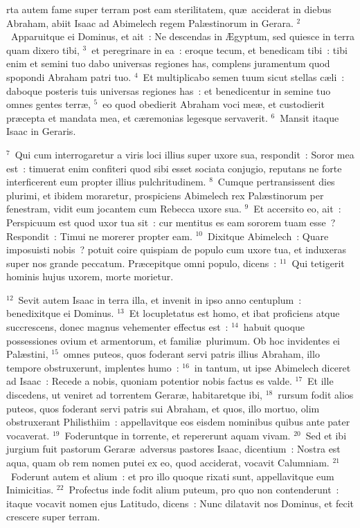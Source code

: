 \bchapter
{}rta autem fame super terram post eam sterilitatem, qu\ae\ acciderat in diebus Abraham, abiit Isaac ad Abimelech regem Pal\ae stinorum in Gerara.
${}^{2}$~Apparuitque ei Dominus, et ait~: Ne descendas in \AE gyptum, sed quiesce in terra quam dixero tibi,
${}^{3}$~et peregrinare in ea~: eroque tecum, et benedicam tibi~: tibi enim et semini tuo dabo universas regiones has, complens juramentum quod spopondi Abraham patri tuo.
${}^{4}$~Et multiplicabo semen tuum sicut stellas c\ae li~: daboque posteris tuis universas regiones has~: et benedicentur in semine tuo omnes gentes terr\ae ,
${}^{5}$~eo quod obedierit Abraham voci me\ae , et custodierit pr\ae cepta et mandata mea, et c\ae remonias legesque servaverit.
${}^{6}$~Mansit itaque Isaac in Geraris.


${}^{7}$~Qui cum interrogaretur a viris loci illius super uxore sua, respondit~: Soror mea est~: timuerat enim confiteri quod sibi esset sociata conjugio, reputans ne forte interficerent eum propter illius pulchritudinem.
${}^{8}$~Cumque pertransissent dies plurimi, et ibidem moraretur, prospiciens Abimelech rex Pal\ae stinorum per fenestram, vidit eum jocantem cum Rebecca uxore sua.
${}^{9}$~Et accersito eo, ait~: Perspicuum est quod uxor tua sit~: cur mentitus es eam sororem tuam esse~? Respondit~: Timui ne morerer propter eam.
${}^{10}$~Dixitque Abimelech~: Quare imposuisti nobis~? potuit coire quispiam de populo cum uxore tua, et induxeras super nos grande peccatum. Pr\ae cepitque omni populo, dicens~:
${}^{11}$~Qui tetigerit hominis hujus uxorem, morte morietur.


${}^{12}$~Sevit autem Isaac in terra illa, et invenit in ipso anno centuplum~: benedixitque ei Dominus.
${}^{13}$~Et locupletatus est homo, et ibat proficiens atque succrescens, donec magnus vehementer effectus est~:
${}^{14}$~habuit quoque possessiones ovium et armentorum, et famili\ae\ plurimum. Ob hoc invidentes ei Pal\ae stini,
${}^{15}$~omnes puteos, quos foderant servi patris illius Abraham, illo tempore obstruxerunt, implentes humo~:
${}^{16}$~in tantum, ut ipse Abimelech diceret ad Isaac~: Recede a nobis, quoniam potentior nobis factus es valde.
${}^{17}$~Et ille discedens, ut veniret ad torrentem Gerar\ae , habitaretque ibi,
${}^{18}$~rursum fodit alios puteos, quos foderant servi patris sui Abraham, et quos, illo mortuo, olim obstruxerant Philisthiim~: appellavitque eos eisdem nominibus quibus ante pater vocaverat.
${}^{19}$~Foderuntque in torrente, et repererunt aquam vivam.
${}^{20}$~Sed et ibi jurgium fuit pastorum Gerar\ae\ adversus pastores Isaac, dicentium~: Nostra est aqua, quam ob rem nomen putei ex eo, quod acciderat, vocavit Calumniam.
${}^{21}$~Foderunt autem et alium~: et pro illo quoque rixati sunt, appellavitque eum Inimicitias.
${}^{22}$~Profectus inde fodit alium puteum, pro quo non contenderunt~: itaque vocavit nomen ejus Latitudo, dicens~: Nunc dilatavit nos Dominus, et fecit crescere super terram.


